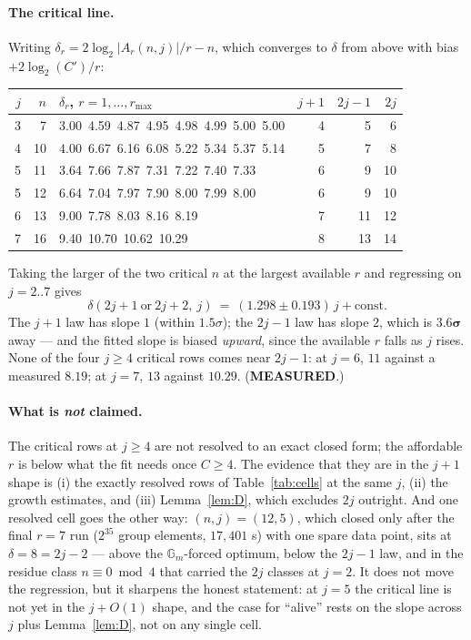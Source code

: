 \documentclass[10pt]{article}
\theoremstyle{plain}
\theoremstyle{definition}
\newcommand{\measuredst}{\textcolor{measured}{\textsf{\textbf{\footnotesize MEASURED}}}}
\begin{document}
\paragraph{The critical line.} Writing
$\delta_r=2\log_2|A_r(n,j)|/r-n$, which converges to $\delta$ from above with
bias $+2\log_2(C')/r$:

\begin{center}\small
\begin{tabular}{rrl@{\qquad}rrr}
\hline
$j$ & $n$ & $\delta_r$, $r=1,\dots,r_{\max}$ & $j{+}1$ & $2j{-}1$ & $2j$\\
\hline
3 & 7 & 3.00\ 4.59\ 4.87\ 4.95\ 4.98\ 4.99\ 5.00\ 5.00 & 4 & 5 & 6\\
4 & 10 & 4.00\ 6.67\ 6.16\ 6.08\ 5.22\ 5.34\ 5.37\ 5.14 & 5 & 7 & 8\\
5 & 11 & 3.64\ 7.66\ 7.87\ 7.31\ 7.22\ 7.40\ 7.33 & 6 & 9 & 10\\
5 & 12 & 6.64\ 7.04\ 7.97\ 7.90\ 8.00\ 7.99\ 8.00 & 6 & 9 & 10\\
6 & 13 & 9.00\ 7.78\ 8.03\ 8.16\ 8.19 & 7 & 11 & 12\\
7 & 16 & 9.40\ 10.70\ 10.62\ 10.29 & 8 & 13 & 14\\
\hline
\end{tabular}
\end{center}

Taking the larger of the two critical $n$ at the largest available $r$ and
regressing on $j=2..7$ gives
\[
 \delta(2j+1\ \text{or}\ 2j+2,\ j)\ =\ (1.298\pm0.193)\,j+\text{const}.
\]
The $j+1$ law has slope $1$ (within $1.5\sigma$); the $2j-1$ law has slope $2$,
which is $\mathbf{3.6\sigma}$ away --- and the fitted slope is biased
\emph{upward}, since the available $r$ falls as $j$ rises. None of the four
$j\ge4$ critical rows comes near $2j-1$: at $j=6$, $11$ against a measured
$8.19$; at $j=7$, $13$ against $10.29$. (\measuredst.)

\paragraph{What is \emph{not} claimed.} The critical rows at $j\ge4$ are not
resolved to an exact closed form; the affordable $r$ is below what the fit needs
once $C\ge4$. The evidence that they are in the $j+1$ shape is (i) the exactly
resolved rows of Table~\ref{tab:cells} at the same $j$, (ii) the growth
estimates, and (iii) Lemma~\ref{lem:D}, which excludes $2j$ outright. And one
resolved cell goes the other way: $(n,j)=(12,5)$, which closed only after the
final $r=7$ run ($2^{35}$ group elements, $17{,}401$ s) with one spare data
point, sits at $\delta=8=2j-2$ --- above the $\mathbb G_m$-forced optimum, below
the $2j-1$ law, and in the residue class $n\equiv0\bmod4$ that carried the
$2j$ classes at $j=2$. It does not move the regression, but it sharpens the
honest statement: at $j=5$ the critical line is not yet in the $j+O(1)$ shape,
and the case for ``alive'' rests on the slope across $j$ plus
Lemma~\ref{lem:D}, not on any single cell.
\end{document}
